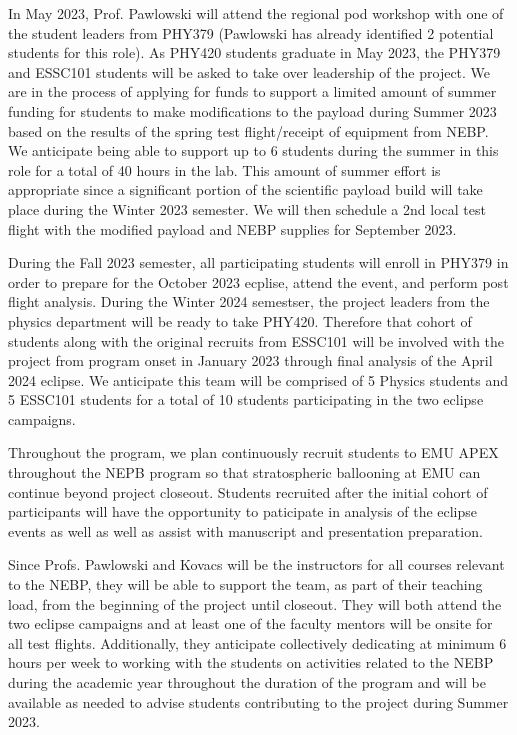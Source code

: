 \documentclass[12pt]{article}
\begin{document}
In May 2023, Prof. Pawlowski will attend the regional pod workshop with one of
the student leaders from PHY379 (Pawlowski has already identified 2 potential students
for this role).
As PHY420 students graduate in May 2023, the PHY379 and ESSC101 students will be
asked to take over leadership of the project. We are in the process of applying for funds
to support a limited amount of summer funding for students to make modifications to the
payload during Summer 2023 based on the results of the spring test flight/receipt
of equipment from NEBP. We anticipate
being able to support up to 6 students during the summer in this role for a total of 40 hours
in the lab. This amount of summer effort is appropriate since a significant portion of the scientific payload build will take place during the
Winter 2023 semester.
We will then schedule a 2nd local test flight with the modified payload and
NEBP supplies for September
2023.

 During the Fall 2023 semester, all participating students will enroll in PHY379 in order
 to prepare for the October 2023 ecplise, attend the event, and perform post flight
 analysis. During the Winter 2024 semestser, the project leaders from the physics department
will be ready to take PHY420. Therefore that cohort of students
along with the original recruits from ESSC101 will be involved with the project from program onset in January 2023 through final analysis of the April 2024 eclipse. We anticipate this
team will be comprised of 5 Physics students and 5 ESSC101 students for a total
of 10 students participating in the two eclipse campaigns.

Throughout the program, we plan continuously recruit students to EMU APEX throughout
 the NEPB program
so that stratospheric ballooning at EMU can continue beyond project closeout. Students recruited after
the initial cohort of participants will have the opportunity to paticipate in
analysis of the eclipse events as well as well as assist with manuscript and presentation
preparation.

Since Profs. Pawlowski and Kovacs will be the
instructors for all courses relevant to the NEBP, they will be able to support the
team, as part of their teaching load, from the beginning of the project until
closeout. They will both attend the two eclipse campaigns and at least one
of the faculty mentors will be onsite for all test flights. Additionally,
they anticipate collectively dedicating at minimum 6 hours per week to working with
the students on activities related to the NEBP during the academic year throughout
the duration of the program and will be available as needed to advise students contributing
to the project during Summer 2023.
\end{document}

